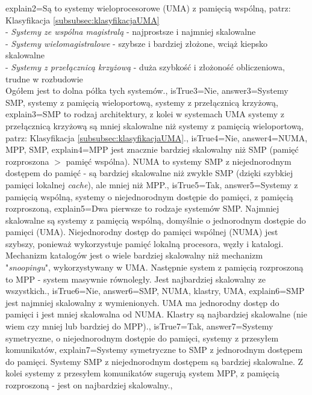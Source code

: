 \begin{enumerate}
\begin{minipage}{\textwidth}
{		explain2={Są to systemy wieloprocesorowe (UMA) z pamięcią wspólną, patrz: Klasyfikacja  \ref{subsubsec:klasyfikacjaUMA}\\
			- \emph{Systemy ze wspólna magistralą} - najprostsze i najmniej skalowalne\\
			- \emph{Systemy wielomagistralowe} - szybsze i bardziej złożone, wciąż kiepsko skalowalne\\
			- \emph{Systemy z przełącznicą krzyżową} - duża szybkość i złożoność obliczeniowa, trudne w rozbudowie\\
			Ogółem jest to dolna półka tych systemów.},%
		isTrue3={Nie},%
		answer3={Systemy SMP, systemy z pamięcią wieloportową, systemy z przełącznicą krzyżową},%
		explain3={SMP to rodzaj architektury, z kolei w systemach UMA systemy z przełącznicą krzyżową są mniej skalowalne niż systemy z pamięcią wieloportową, patrz: Klasyfikacja  \ref{subsubsec:klasyfikacjaUMA}.},%
		isTrue4={Nie},%
		answer4={NUMA, MPP, SMP},%
		explain4={MPP jest znacznie bardziej skalowalny niż SMP (pamięć rozproszona $ > $ pamięć wspólna). NUMA to systemy SMP z niejednorodnym dostępem do pamięć - są bardziej skalowalne niż zwykłe SMP (dzięki szybkiej pamięci lokalnej \emph{cache}), ale mniej niż MPP.},%
		isTrue5={Tak},%
		answer5={Systemy z pamięcią wspólną, systemy o niejednorodnym dostępie do pamięci, z pamięcią rozproszoną}, %
		explain5={Dwa pierwsze to rodzaje systemów SMP. Najmniej skalowalne są systemy z pamięcią wspólną, domyślnie o jednorodnym dostępie do pamięci (UMA). Niejednorodny dostęp do pamięci wspólnej (NUMA) jest szybszy, ponieważ wykorzystuje pamięć lokalną procesora, węzły i katalogi. Mechanizm katalogów jest o wiele bardziej skalowalny niż mechanizm "\emph{snoopingu}", wykorzystywany w UMA. Następnie system z pamięcią rozproszoną to MPP - system masywnie równoległy. Jest najbardziej skalowalny ze wszystkich.}, %
		isTrue6={Nie}, %
		answer6={SMP, NUMA, klastry, UMA}, %
		explain6={SMP jest najmniej skalowalny z wymienionych. UMA ma jednorodny dostęp do pamięci i jest mniej skalowalna od NUMA. Klastry są najbardziej skalowalne (nie wiem czy mniej lub bardziej do MPP).}, %
		isTrue7={Tak}, %
		answer7={Systemy symetryczne, o niejednorodnym dostępie do pamięci, systemy z przesyłem komunikatów}, %
		explain7={Systemy symetryczne to SMP z jednorodnym dostępem do pamięci. Systemy SMP z niejednorodnym dostępem są bardziej skalowalne. Z kolei systemy z przesyłem komunikatów sugerują system MPP, z pamięcią rozproszoną - jest on najbardziej skalowalny.}, %
	}
\end{minipage}
\begin{minipage}{\textwidth}

\end{minipage}
\end{enumerate}
